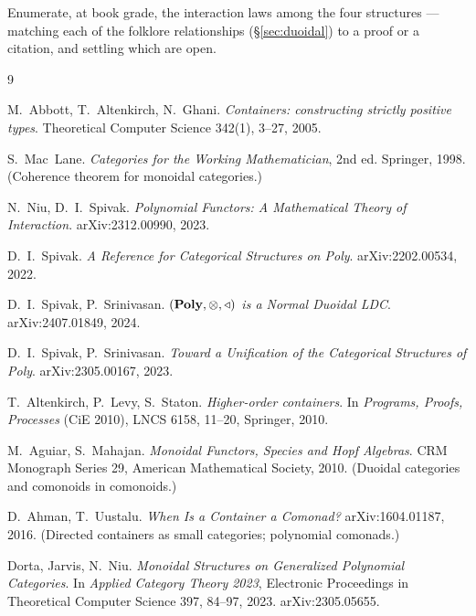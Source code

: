 \begin{Question}\label{q:atlas}
Enumerate, at book grade, the interaction laws among the four structures ---
matching each of the folklore relationships (§\ref{sec:duoidal}) to a proof or a
citation, and settling which are open.
\end{Question}

\begin{thebibliography}{9}

 M.~Abbott, T.~Altenkirch, N.~Ghani.
  \emph{Containers: constructing strictly positive types}.
  Theoretical Computer Science 342(1), 3--27, 2005.

 S.~Mac~Lane.
  \emph{Categories for the Working Mathematician}, 2nd ed.
  Springer, 1998. (Coherence theorem for monoidal categories.)

 N.~Niu, D.~I.~Spivak.
  \emph{Polynomial Functors: A Mathematical Theory of Interaction}.
  arXiv:2312.00990, 2023.

 D.~I.~Spivak.
  \emph{A Reference for Categorical Structures on \textup{Poly}}.
  arXiv:2202.00534, 2022.

 D.~I.~Spivak, P.~Srinivasan.
  \emph{$(\mathbf{Poly},\otimes,\triangleleft)$ is a Normal Duoidal LDC}.
  arXiv:2407.01849, 2024.

 D.~I.~Spivak, P.~Srinivasan.
  \emph{Toward a Unification of the Categorical Structures of \textup{Poly}}.
  arXiv:2305.00167, 2023.

 T.~Altenkirch, P.~Levy, S.~Staton.
  \emph{Higher-order containers}.
  In \emph{Programs, Proofs, Processes} (CiE 2010), LNCS 6158, 11--20, Springer, 2010.

 M.~Aguiar, S.~Mahajan.
  \emph{Monoidal Functors, Species and Hopf Algebras}.
  CRM Monograph Series 29, American Mathematical Society, 2010.
  (Duoidal categories and comonoids in comonoids.)

 D.~Ahman, T.~Uustalu.
  \emph{When Is a Container a Comonad?}
  arXiv:1604.01187, 2016.
  (Directed containers as small categories; polynomial comonads.)

 Dorta, Jarvis, N.~Niu.
  \emph{Monoidal Structures on Generalized Polynomial Categories}.
  In \emph{Applied Category Theory 2023}, Electronic Proceedings in Theoretical
  Computer Science 397, 84--97, 2023. arXiv:2305.05655.


\end{thebibliography}


